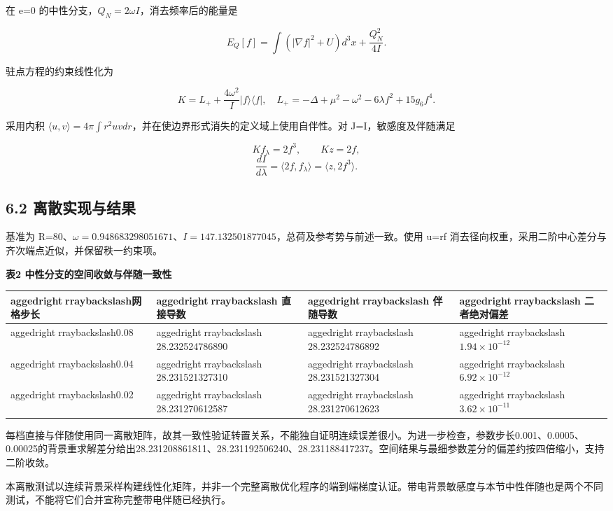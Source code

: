 \documentclass[UTF8,fontset=fandol,11pt]{ctexart}
\begin{document}
在 e=0 的中性分支，\(Q_N=2\omega I\)，消去频率后的能量是

\[
E_Q[f]=\int(|\nabla f|^2+U)d^3x+\frac{Q_N^2}{4I}.
\tag{22}
\]

驻点方程的约束线性化为

\[
K=L_++\frac{4\omega^2}{I}|f\rangle\langle f|,
\quad L_+=-\Delta+\mu^2-\omega^2-6\lambda f^2+15g_6f^4.
\tag{23}
\]

采用内积 \(\langle u,v\rangle=4\pi\int r^2uvdr\)，并在使边界形式消失的定义域上使用自伴性。对 J=I，敏感度及伴随满足

\[
Kf_\lambda=2f^3,\qquad Kz=2f,
\]
\[
\frac{dI}{d\lambda}=\langle2f,f_\lambda\rangle
=\langle z,2f^3\rangle.
\tag{24}
\]

\subsection*{6.2 离散实现与结果}

基准为 R=80、\(\omega=0.948683298051671\)、\(I=147.132501877045\)，总荷及参考势与前述一致。使用 u=rf 消去径向权重，采用二阶中心差分与齐次端点近似，并保留秩一约束项。

\textbf{表2 中性分支的空间收敛与伴随一致性}

\begin{center}
\small
\begin{tabularx}{\textwidth}{>{
aggedrightrraybackslash}X>{
aggedrightrraybackslash}X>{
aggedrightrraybackslash}X>{
aggedrightrraybackslash}X}
\toprule
网格步长 & 直接导数 & 伴随导数 & 二者绝对偏差 \\
\midrule
0.08 & 28.232524786890 & 28.232524786892 & \(1.94\times10^{-12}\) \\
0.04 & 28.231521327310 & 28.231521327304 & \(6.92\times10^{-12}\) \\
0.02 & 28.231270612587 & 28.231270612623 & \(3.62\times10^{-11}\) \\
\bottomrule
\end{tabularx}
\end{center}

每档直接与伴随使用同一离散矩阵，故其一致性验证转置关系，不能独自证明连续误差很小。为进一步检查，参数步长0.001、0.0005、0.00025的背景重求解差分给出28.231208861811、28.231192506240、28.231188417237。空间结果与最细参数差分的偏差约按四倍缩小，支持二阶收敛。

本离散测试以连续背景采样构建线性化矩阵，并非一个完整离散优化程序的端到端梯度认证。带电背景敏感度与本节中性伴随也是两个不同测试，不能将它们合并宣称完整带电伴随已经执行。
\end{document}
